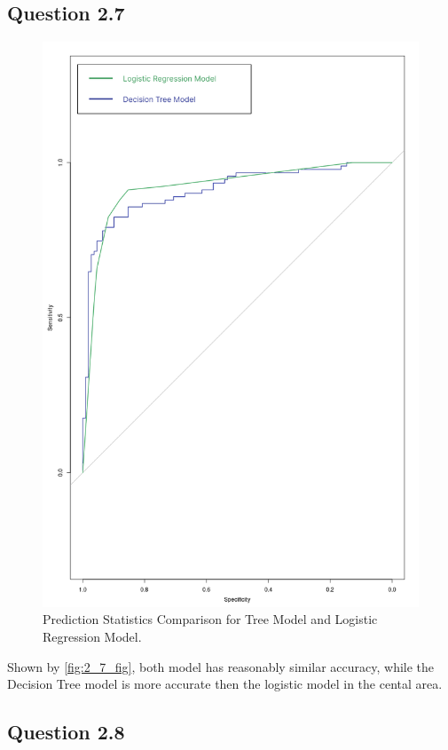 \documentclass[parskip=full]{scrartcl}
\begin{document}
    \subsection*{Question 2.7}
    
    
    \begin{figure}
        \centering
        \includegraphics[width=0.9\linewidth]{diagrams/comp_test.png}
        \caption{Prediction Statistics Comparison for Tree Model and Logistic Regression Model.}
        \label{fig:2_7_fig}
    \end{figure}

    Shown by \autoref{fig:2_7_fig}, both model has reasonably similar accuracy, while the Decision Tree model is more accurate then the logistic model in the cental area.

    \subsection*{Question 2.8}
    
\end{document}
